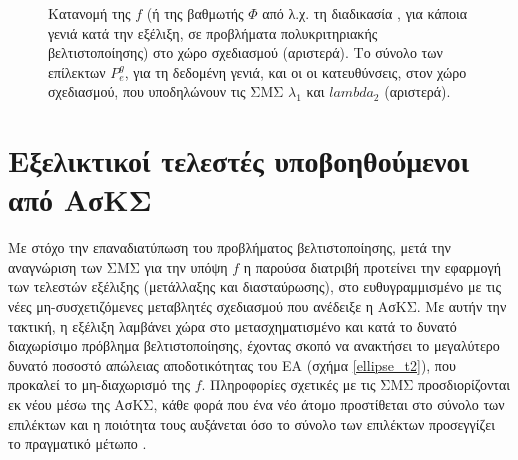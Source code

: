 \begin{figure}[h!]
\begin{minipage}[b]{1\linewidth}
 \centering
\end{minipage}
\caption{Κατανομή της $f$ (ή της βαθμωτής $\Phi$ από λ.χ. τη διαδικασία , για κάποια γενιά κατά την εξέλιξη, σε προβλήματα πολυκριτηριακής βελτιστοποίησης) στο χώρο σχεδιασμού (αριστερά). Το σύνολο των επίλεκτων $P^g_e$, για τη δεδομένη γενιά, και οι οι κατευθύνσεις, στον χώρο σχεδιασμού, που υποδηλώνουν τις ΣΜΣ $\lambda_1$ και $lambda_2$ (αριστερά).} 
\label{reco1}
\end{figure}
       

\section{Εξελικτικοί τελεστές υποβοηθούμενοι από ΑσΚΣ} 

Με στόχο την επαναδιατύπωση του προβλήματος βελτιστοποίησης, μετά την αναγνώριση των ΣΜΣ για την υπόψη $f$ η παρούσα διατριβή προτείνει την εφαρμογή των τελεστών εξέλιξης (μετάλλαξης και διασταύρωσης), στο ευθυγραμμισμένο με τις νέες μη-συσχετιζόμενες μεταβλητές σχεδιασμού που ανέδειξε η ΑσΚΣ. Με αυτήν την τακτική, η εξέλιξη λαμβάνει χώρα στο μετασχηματισμένο και κατά το δυνατό διαχωρίσιμο πρόβλημα βελτιστοποίησης, έχοντας σκοπό να ανακτήσει το μεγαλύτερο δυνατό ποσοστό απώλειας αποδοτικότητας του ΕΑ (σχήμα \ref{ellipse_t2}), που προκαλεί το μη-διαχωρισμό της $f$. Πληροφορίες σχετικές με τις ΣΜΣ προσδιορίζονται εκ νέου μέσω της ΑσΚΣ, κάθε φορά που ένα νέο άτομο προστίθεται στο σύνολο των επιλέκτων και η ποιότητα τους αυξάνεται όσο το σύνολο των επιλέκτων προσεγγίζει το πραγματικό μέτωπο .              

